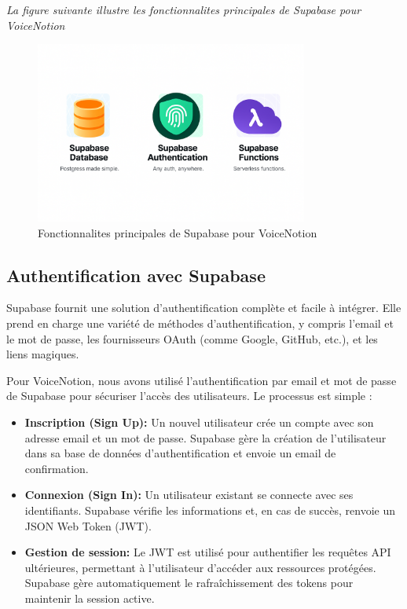 \noindent
\textit{La figure suivante illustre les fonctionnalites principales de Supabase pour VoiceNotion}
\begin{figure}[H]
\centering
\includegraphics[width=0.8\textwidth]{assets/docs/golobal-diagrams/supabase-feature.png}
\caption{Fonctionnalites principales de Supabase pour VoiceNotion}
\label{fig:supabase-feature}
\end{figure}


\subsection{Authentification avec Supabase}

Supabase fournit une solution d'authentification complète et facile à intégrer. Elle prend en charge une variété de méthodes d'authentification, y compris l'email et le mot de passe, les fournisseurs OAuth (comme Google, GitHub, etc.), et les liens magiques.

Pour VoiceNotion, nous avons utilisé l'authentification par email et mot de passe de Supabase pour sécuriser l'accès des utilisateurs. Le processus est simple :
\begin{itemize}
    \item \textbf{Inscription (Sign Up):} Un nouvel utilisateur crée un compte avec son adresse email et un mot de passe. Supabase gère la création de l'utilisateur dans sa base de données d'authentification et envoie un email de confirmation.
    \item \textbf{Connexion (Sign In):} Un utilisateur existant se connecte avec ses identifiants. Supabase vérifie les informations et, en cas de succès, renvoie un JSON Web Token (JWT).
    \item \textbf{Gestion de session:} Le JWT est utilisé pour authentifier les requêtes API ultérieures, permettant à l'utilisateur d'accéder aux ressources protégées. Supabase gère automatiquement le rafraîchissement des tokens pour maintenir la session active.
\end{itemize}

